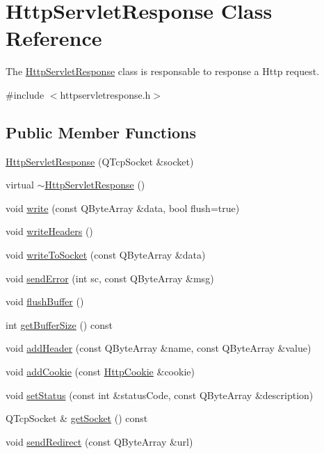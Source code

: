 \hypertarget{class_http_servlet_response}{}\section{Http\+Servlet\+Response Class Reference}
\label{class_http_servlet_response}


The \hyperlink{class_http_servlet_response}{Http\+Servlet\+Response} class is responsable to response a Http request.  




{\ttfamily \#include $<$httpservletresponse.\+h$>$}

\subsection*{Public Member Functions}
\begin{DoxyCompactItemize}
\item 
\hyperlink{class_http_servlet_response_ac275248f0418ac2a300dc3cbb71056eb}{Http\+Servlet\+Response} (Q\+Tcp\+Socket \&socket)
\item 
virtual \hyperlink{class_http_servlet_response_a4980467a046f22188c8ef01fb941c44d}{$\sim$\+Http\+Servlet\+Response} ()
\item 
void \hyperlink{class_http_servlet_response_ab99b60f65f71d416649f96e9e84c41af}{write} (const Q\+Byte\+Array \&data, bool flush=true)
\item 
void \hyperlink{class_http_servlet_response_a161c99d90e6bd565246bb31784ac71ec}{write\+Headers} ()
\item 
void \hyperlink{class_http_servlet_response_a43db6f1b9c750dd2a66b823291023f3e}{write\+To\+Socket} (const Q\+Byte\+Array \&data)
\item 
void \hyperlink{class_http_servlet_response_a7023895f3b4b730b7a97679bea88466b}{send\+Error} (int sc, const Q\+Byte\+Array \&msg)
\item 
void \hyperlink{class_http_servlet_response_a97cefdfdc34111189c8aef36397c053c}{flush\+Buffer} ()
\item 
int \hyperlink{class_http_servlet_response_a8ffb98c0d0dc7c3808a486f652ba31e7}{get\+Buffer\+Size} () const
\item 
void \hyperlink{class_http_servlet_response_ae9bd0d1b4fa31ffc03e93253a1f41a36}{add\+Header} (const Q\+Byte\+Array \&name, const Q\+Byte\+Array \&value)
\item 
void \hyperlink{class_http_servlet_response_a40fb3e4c9ababe741ddbda87c932409d}{add\+Cookie} (const \hyperlink{class_http_cookie}{Http\+Cookie} \&cookie)
\item 
void \hyperlink{class_http_servlet_response_a180f9d63cb4640fcf13f01badef9fede}{set\+Status} (const int \&status\+Code, const Q\+Byte\+Array \&description)
\item 
Q\+Tcp\+Socket \& \hyperlink{class_http_servlet_response_a723210f05b22fa9cfe84e3460c6b33ff}{get\+Socket} () const
\item 
void \hyperlink{class_http_servlet_response_a3f4a749e518ad2b89aaf179c5e5fe034}{send\+Redirect} (const Q\+Byte\+Array \&url)
\end{DoxyCompactItemize}
